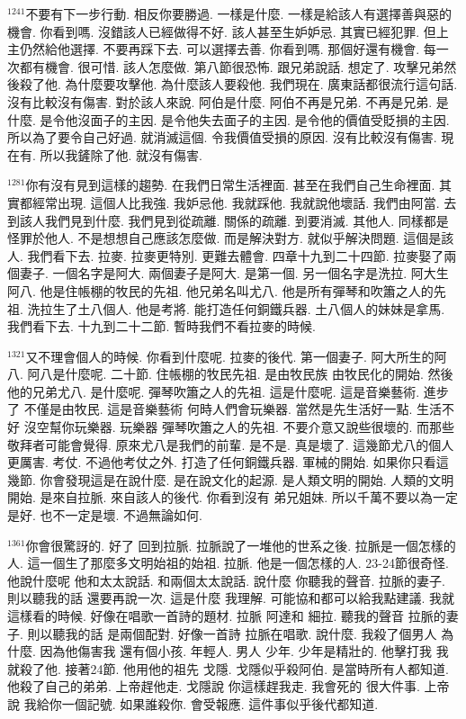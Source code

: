 \documentclass{book}
\begin{document}
$^{1241}$不要有下一步行動.
相反你要勝過.
一樣是什麼.
一樣是給該人有選擇善與惡的機會.
你看到嗎.
沒錯該人已經做得不好.
該人甚至生妒妒忌.
其實已經犯罪.
但上主仍然給他選擇.
不要再踩下去.
可以選擇去善.
你看到嗎.
那個好還有機會.
每一次都有機會.
很可惜.
該人怎麼做.
第八節很恐怖.
跟兄弟說話.
想定了.
攻擊兄弟然後殺了他.
為什麼要攻擊他.
為什麼該人要殺他.
我們現在.
廣東話都很流行這句話.
沒有比較沒有傷害.
對於該人來說.
阿伯是什麼.
阿伯不再是兄弟.
不再是兄弟.
是什麼.
是令他沒面子的主因.
是令他失去面子的主因.
是令他的價值受貶損的主因.
所以為了要令自己好過.
就消滅這個.
令我價值受損的原因.
沒有比較沒有傷害.
現在有.
所以我鏟除了他.
就沒有傷害.

$^{1281}$你有沒有見到這樣的趨勢.
在我們日常生活裡面.
甚至在我們自己生命裡面.
其實都經常出現.
這個人比我強.
我妒忌他.
我就踩他.
我就說他壞話.
我們由阿當.
去到該人我們見到什麼.
我們見到從疏離.
關係的疏離.
到要消滅.
其他人.
同樣都是怪罪於他人.
不是想想自己應該怎麼做.
而是解決對方.
就似乎解決問題.
這個是該人.
我們看下去.
拉麥.
拉麥更特別.
更難去體會.
四章十九到二十四節.
拉麥娶了兩個妻子.
一個名字是阿大.
兩個妻子是阿大.
是第一個.
另一個名字是洗拉.
阿大生阿八.
他是住帳棚的牧民的先祖.
他兄弟名叫尤八.
他是所有彈琴和吹簫之人的先祖.
洗拉生了土八個人.
他是考將.
能打造任何銅鐵兵器.
土八個人的妹妹是拿馬.
我們看下去.
十九到二十二節.
暫時我們不看拉麥的時候.

$^{1321}$又不理會個人的時候.
你看到什麼呢.
拉麥的後代.
第一個妻子.
阿大所生的阿八.
阿八是什麼呢.
二十節.
住帳棚的牧民先祖.
是由牧民族 由牧民化的開始.
然後他的兄弟尤八.
是什麼呢.
彈琴吹簫之人的先祖.
這是什麼呢.
這是音樂藝術.
進步了 不僅是由牧民.
這是音樂藝術 何時人們會玩樂器.
當然是先生活好一點.
生活不好 沒空幫你玩樂器.
玩樂器 彈琴吹簫之人的先祖.
不要介意又說些很壞的.
而那些敬拜者可能會覺得.
原來尤八是我們的前輩.
是不是.
真是壞了.
這幾節尤八的個人更厲害.
考仗.
不過他考仗之外.
打造了任何銅鐵兵器.
軍械的開始.
如果你只看這幾節.
你會發現這是在說什麼.
是在說文化的起源.
是人類文明的開始.
人類的文明開始.
是來自拉脈.
來自該人的後代.
你看到沒有 弟兄姐妹.
所以千萬不要以為一定是好.
也不一定是壞.
不過無論如何.

$^{1361}$你會很驚訝的.
好了 回到拉脈.
拉脈說了一堆他的世系之後.
拉脈是一個怎樣的人.
這一個生了那麼多文明始祖的始祖.
拉脈.
他是一個怎樣的人.
23-24節很奇怪.
他說什麼呢 他和太太說話.
和兩個太太說話.
說什麼 你聽我的聲音.
拉脈的妻子.
則以聽我的話 還要再說一次.
這是什麼 我理解.
可能協和都可以給我點建議.
我就這樣看的時候.
好像在唱歌一首詩的題材.
拉脈 阿達和 細拉.
聽我的聲音 拉脈的妻子.
則以聽我的話 是兩個配對.
好像一首詩 拉脈在唱歌.
說什麼.
我殺了個男人 為什麼.
因為他傷害我 還有個小孩.
年輕人.
男人 少年.
少年是精壯的.
他擊打我 我就殺了他.
接著24節.
他用他的祖先 戈隱.
戈隱似乎殺阿伯.
是當時所有人都知道.
他殺了自己的弟弟.
上帝趕他走.
戈隱說 你這樣趕我走.
我會死的 很大件事.
上帝說 我給你一個記號.
如果誰殺你.
會受報應.
這件事似乎後代都知道.
\end{document}
